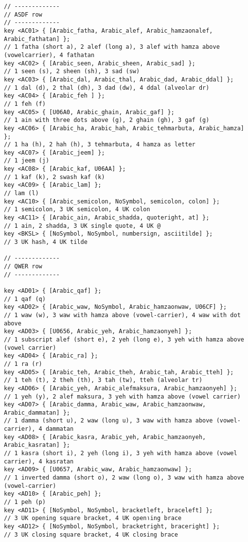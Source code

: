 \begin{verbatim}
// -------------
// ASDF row
// -------------
key <AC01> { [Arabic_fatha, Arabic_alef, Arabic_hamzaonalef, Arabic_fathatan] };
// 1 fatha (short a), 2 alef (long a), 3 alef with hamza above (vowelcarrier), 4 fathatan
key <AC02> { [Arabic_seen, Arabic_sheen, Arabic_sad] };
// 1 seen (s), 2 sheen (sh), 3 sad (sw)
key <AC03> { [Arabic_dal, Arabic_thal, Arabic_dad, Arabic_ddal] };
// 1 dal (d), 2 thal (dh), 3 dad (dw), 4 ddal (alveolar dr)
key <AC04> { [Arabic_feh ] };
// 1 feh (f)
key <AC05> { [U06A0, Arabic_ghain, Arabic_gaf] };
// 1 ain with three dots above (g), 2 ghain (gh), 3 gaf (g)
key <AC06> { [Arabic_ha, Arabic_hah, Arabic_tehmarbuta, Arabic_hamza] };
// 1 ha (h), 2 hah (h), 3 tehmarbuta, 4 hamza as letter
key <AC07> { [Arabic_jeem] }; 
// 1 jeem (j)
key <AC08> { [Arabic_kaf, U06AA] };
// 1 kaf (k), 2 swash kaf (k)
key <AC09> { [Arabic_lam] };
// lam (l)
key <AC10> { [Arabic_semicolon, NoSymbol, semicolon, colon] };
// 1 semicolon, 3 UK semicolon, 4 UK colon
key <AC11> { [Arabic_ain, Arabic_shadda, quoteright, at] };
// 1 ain, 2 shadda, 3 UK single quote, 4 UK @    
key <BKSL> { [NoSymbol, NoSymbol, numbersign, asciitilde] };
// 3 UK hash, 4 UK tilde

// -------------
// QWER row
// -------------

key <AD01> { [Arabic_qaf] }; 
// 1 qaf (q)
key <AD02> { [Arabic_waw, NoSymbol, Arabic_hamzaonwaw, U06CF] };
// 1 waw (w), 3 waw with hamza above (vowel-carrier), 4 waw with dot above
key <AD03> { [U0656, Arabic_yeh, Arabic_hamzaonyeh] };
// 1 subscript alef (short e), 2 yeh (long e), 3 yeh with hamza above (vowel carrier)
key <AD04> { [Arabic_ra] };
// 1 ra (r)
key <AD05> { [Arabic_teh, Arabic_theh, Arabic_tah, Arabic_tteh] };
// 1 teh (t), 2 theh (th), 3 tah (tw), tteh (alveolar tr)
key <AD06> { [Arabic_yeh, Arabic_alefmaksura, Arabic_hamzaonyeh] };
// 1 yeh (y), 2 alef maksura, 3 yeh with hamza above (vowel carrier)
key <AD07> { [Arabic_damma, Arabic_waw, Arabic_hamzaonwaw, Arabic_dammatan] };
// 1 damma (short u), 2 waw (long u), 3 waw with hamza above (vowel-carrier), 4 dammatan
key <AD08> { [Arabic_kasra, Arabic_yeh, Arabic_hamzaonyeh, Arabic_kasratan] };
// 1 kasra (short i), 2 yeh (long i), 3 yeh with hamza above (vowel carrier), 4 kasratan
key <AD09> { [U0657, Arabic_waw, Arabic_hamzaonwaw] };
// 1 inverted damma (short o), 2 waw (long o), 3 waw with hamza above (vowel-carrier)
key <AD10> { [Arabic_peh] };
// 1 peh (p)
key <AD11> { [NoSymbol, NoSymbol, bracketleft, braceleft] }; 
// 3 UK opening square bracket, 4 UK open١ing brace
key <AD12> { [NoSymbol, NoSymbol, bracketright, braceright] };
// 3 UK closing square bracket, 4 UK closing brace


\end{verbatim}
